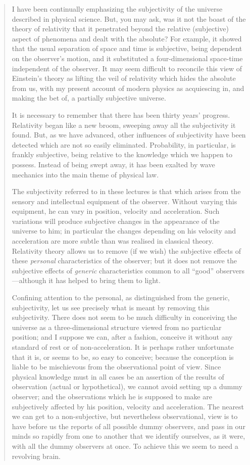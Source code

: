 \documentclass{article}
\begin{document}
\begin{quote}
    I have been continually emphasizing the subjectivity of the universe described in physical science.  But, you may ask, was it not the boast of the theory of relativity that it penetrated beyond the relative (subjective) aspect of phenomena and dealt with the absolute?  For example, it showed that the usual separation of space and time is subjective, being dependent on the observer's motion, and it substituted a four-dimensional space-time independent of the observer.  It may seem difficult to reconcile this view of Einstein's theory as lifting the veil of relativity which hides the absolute from us, with my present account of modern physics as acquiescing in, and making the bet of, a partially subjective universe.

    It is necessary to remember that there has been thirty years' progress.  Relativity began like a new broom, sweeping away all the subjectivity it found.  But, as we have advanced, other influences of subjectivity have been detected which are not so easily eliminated.  Probability, in particular, is frankly subjective, being relative to the knowledge which we happen to possess.  Instead of being swept away, it has been exalted by wave mechanics into the main theme of physical law.

    The subjectivity referred to in these lectures is that which arises from the sensory and intellectual equipment of the observer.  Without varying this equipment, he can vary in position, velocity and acceleration.  Such variations will produce subjective changes in the appearance of the universe to him; in particular the changes depending on his velocity and acceleration are more subtle than was realised in classical theory.  Relativity theory allows us to remove (if we wish) the subjective effects of these \emph{personal} characteristics of the observer; but it does not remove the subjective effects of \emph{generic} characteristics common to all ``good'' observers---although it has helped to bring them to light.

    Confining attention to the personal, as distinguished from the generic, subjectivity, let us see precisely what is meant by removing this subjectivity.  There does not seem to be much difficulty in conceiving the universe as a three-dimensional structure viewed from no particular position; and I suppose we can, after a fashion, conceive it without any standard of rest or of non-acceleration.  It is perhaps rather unfortunate that it is, or seems to be, so easy to conceive; because the conception is liable to be mischievous from the observational point of view.  Since physical knowledge must in all cases be an assertion of the results of observation (actual or hypothetical), we cannot avoid setting up a dummy observer; and the observations which he is supposed to make are subjectively affected by his position, velocity and acceleration.  The nearest we can get to a non-subjective, but nevertheless observational, view is to have before us the reports of all possible dummy observers, and pass in our minds so rapidly from one to another that we identify ourselves, as it were, with all the dummy observers at once.  To achieve this we seem to need a revolving brain.  


\end{quote}
\end{document}
